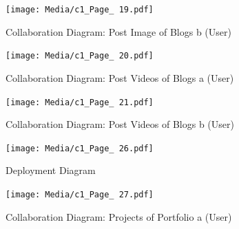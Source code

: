 \documentclass[12pt]{report}
\begin{document}
\begin{figure}[ht]
    \centering
    \texttt{[image: Media/c1\_Page\_ 19.pdf]} %
    \caption{Collaboration Diagram: Post Image of Blogs b (User)}
    \label{fig:drawing1}
\end{figure}

\begin{figure}[ht]
    \centering
    \texttt{[image: Media/c1\_Page\_ 20.pdf]} %
    \caption{Collaboration Diagram: Post Videos of Blogs a (User)}
    \label{fig:drawing1}
\end{figure}

\begin{figure}[ht]
    \centering
    \texttt{[image: Media/c1\_Page\_ 21.pdf]} %
    \caption{Collaboration Diagram: Post Videos of Blogs b (User)}
    \label{fig:drawing1}
\end{figure}





\begin{figure}[ht]
    \centering
    \texttt{[image: Media/c1\_Page\_ 26.pdf]} %
    \caption{Deployment Diagram}
    \label{fig:drawing1}
\end{figure}

\begin{figure}[ht]
    \centering
    \texttt{[image: Media/c1\_Page\_ 27.pdf]} %
    \caption{Collaboration Diagram: Projects of Portfolio a (User)}
    \label{fig:drawing1}
\end{figure}
\end{document}
